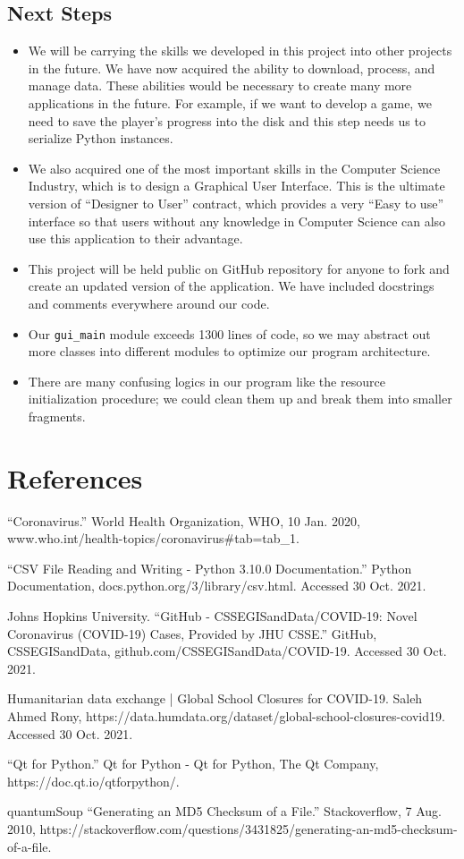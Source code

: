 \documentclass[fontsize=11pt]{article}
\begin{document}
    \subsection{Next Steps}

    \begin{itemize}
        \item We will be carrying the skills we developed in this project into other projects in the future. We have now acquired the ability to download, process, and manage data. These abilities would be necessary to create many more applications in the future. For example, if we want to develop a game, we need to save the player's progress into the disk and this step needs us to serialize Python instances.
        \item We also acquired one of the most important skills in the Computer Science Industry, which is to design a Graphical User Interface. This is the ultimate version of ``Designer to User'' contract, which provides a very ``Easy to use'' interface so that users without any knowledge in Computer Science can also use this application to their advantage.
        \item This project will be held public on GitHub repository for anyone to fork and create an updated version of the application. We have included docstrings and comments everywhere around our code.
        \item Our \verb|gui_main| module exceeds 1300 lines of code, so we may abstract out more classes into different modules to optimize our program architecture.
        \item There are many confusing logics in our program like the resource initialization procedure; we could clean them up and break them into smaller fragments.
    \end{itemize}

    \newpage

    \section{References}

    ``Coronavirus.'' World Health Organization, WHO, 10 Jan. 2020, www.who.int/health-topics/coronavirus\#tab=tab\_1.

    ``CSV File Reading and Writing - Python 3.10.0 Documentation.'' Python Documentation, docs.python.org/3/library/csv.html. Accessed 30 Oct. 2021.

    Johns Hopkins University. ``GitHub - CSSEGISandData/COVID-19: Novel Coronavirus (COVID-19) Cases, Provided by JHU CSSE.'' GitHub, CSSEGISandData, github.com/CSSEGISandData/COVID-19. Accessed 30 Oct. 2021.

    Humanitarian data exchange | Global School Closures for COVID-19. Saleh Ahmed Rony, https://data.humdata.org/dataset/global-school-closures-covid19. Accessed 30 Oct. 2021.

    ``Qt for Python.'' Qt for Python - Qt for Python, The Qt Company, https://doc.qt.io/qtforpython/. 

    quantumSoup ``Generating an MD5 Checksum of a File.'' Stackoverflow, 7 Aug. 2010, https://stackoverflow.com/questions/3431825/generating-an-md5-checksum-of-a-file. 
\end{document}
